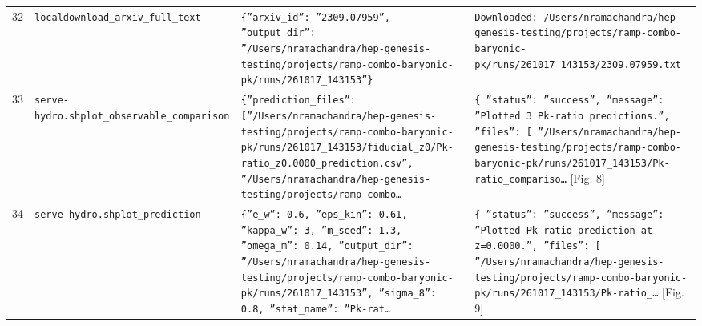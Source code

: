 \documentclass[11pt,a4paper]{article}
\begin{document}
\begin{longtable}{@{}p{}p{}p{}p{}@{}}
32 & \texttt{local}\newline\texttt{download\_\allowbreak{}arxiv\_\allowbreak{}full\_\allowbreak{}text} & \texttt{\{''arxiv\_\allowbreak{}id'':\allowbreak{} ''2309.07959'',\allowbreak{} ''output\_\allowbreak{}dir'':\allowbreak{} ''/\allowbreak{}Users/\allowbreak{}nramachandra/\allowbreak{}hep-genesis-testing/\allowbreak{}projects/\allowbreak{}ramp-combo-baryonic-pk/\allowbreak{}runs/\allowbreak{}261017\_\allowbreak{}143153''\}\allowbreak{}} & \texttt{Downloaded:\allowbreak{} /\allowbreak{}Users/\allowbreak{}nramachandra/\allowbreak{}hep-genesis-testing/\allowbreak{}projects/\allowbreak{}ramp-combo-baryonic-pk/\allowbreak{}runs/\allowbreak{}261017\_\allowbreak{}143153/\allowbreak{}2309.07959.txt} \\
33 & \texttt{serve-hydro.sh}\newline\texttt{plot\_\allowbreak{}observable\_\allowbreak{}comparison} & \texttt{\{''prediction\_\allowbreak{}files'':\allowbreak{} [''/\allowbreak{}Users/\allowbreak{}nramachandra/\allowbreak{}hep-genesis-testing/\allowbreak{}projects/\allowbreak{}ramp-combo-baryonic-pk/\allowbreak{}runs/\allowbreak{}261017\_\allowbreak{}143153/\allowbreak{}fiducial\_\allowbreak{}z0/\allowbreak{}Pk-ratio\_\allowbreak{}z0.0000\_\allowbreak{}prediction.csv'',\allowbreak{} ''/\allowbreak{}Users/\allowbreak{}nramachandra/\allowbreak{}hep-genesis-testing/\allowbreak{}projects/\allowbreak{}ramp-combo\ldots{}\allowbreak{}} & \texttt{\{   ''status'':\allowbreak{} ''success'',\allowbreak{}   ''message'':\allowbreak{} ''Plotted 3 Pk-ratio predictions.'',\allowbreak{}   ''files'':\allowbreak{} [     ''/\allowbreak{}Users/\allowbreak{}nramachandra/\allowbreak{}hep-genesis-testing/\allowbreak{}projects/\allowbreak{}ramp-combo-baryonic-pk/\allowbreak{}runs/\allowbreak{}261017\_\allowbreak{}143153/\allowbreak{}Pk-ratio\_\allowbreak{}compariso\ldots{}\allowbreak{}} [Fig. 8] \\
34 & \texttt{serve-hydro.sh}\newline\texttt{plot\_\allowbreak{}prediction} & \texttt{\{''e\_\allowbreak{}w'':\allowbreak{} 0.6,\allowbreak{} ''eps\_\allowbreak{}kin'':\allowbreak{} 0.61,\allowbreak{} ''kappa\_\allowbreak{}w'':\allowbreak{} 3,\allowbreak{} ''m\_\allowbreak{}seed'':\allowbreak{} 1.3,\allowbreak{} ''omega\_\allowbreak{}m'':\allowbreak{} 0.14,\allowbreak{} ''output\_\allowbreak{}dir'':\allowbreak{} ''/\allowbreak{}Users/\allowbreak{}nramachandra/\allowbreak{}hep-genesis-testing/\allowbreak{}projects/\allowbreak{}ramp-combo-baryonic-pk/\allowbreak{}runs/\allowbreak{}261017\_\allowbreak{}143153'',\allowbreak{} ''sigma\_\allowbreak{}8'':\allowbreak{} 0.8,\allowbreak{} ''stat\_\allowbreak{}name'':\allowbreak{} ''Pk-rat\ldots{}\allowbreak{}} & \texttt{\{   ''status'':\allowbreak{} ''success'',\allowbreak{}   ''message'':\allowbreak{} ''Plotted Pk-ratio prediction at z=\allowbreak{}0.0000.'',\allowbreak{}   ''files'':\allowbreak{} [     ''/\allowbreak{}Users/\allowbreak{}nramachandra/\allowbreak{}hep-genesis-testing/\allowbreak{}projects/\allowbreak{}ramp-combo-baryonic-pk/\allowbreak{}runs/\allowbreak{}261017\_\allowbreak{}143153/\allowbreak{}Pk-ratio\_\allowbreak{}\ldots{}\allowbreak{}} [Fig. 9] \\

\end{longtable}
\end{document}
